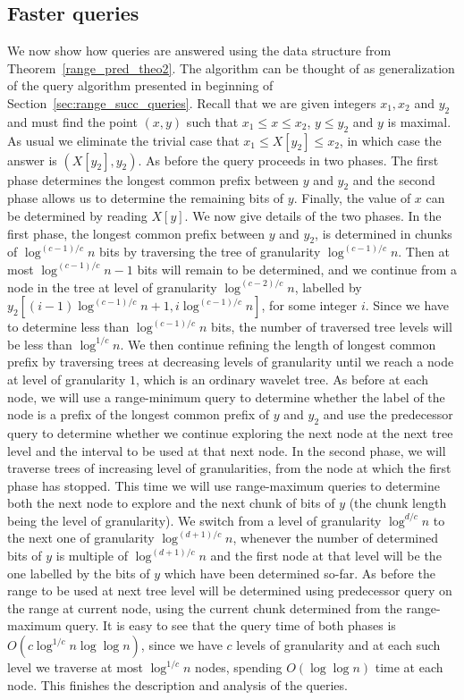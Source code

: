 \documentclass[11pt,runningheads]{llncs}
\begin{document}
\subsection{Faster queries}
\label{subsec:faster_range_pred}
We now show how queries are answered using the data structure
from Theorem~\ref{range_pred_theo2}. The algorithm can be thought of as generalization 
of the query algorithm presented in beginning of Section~\ref{sec:range_succ_queries}. 
Recall that we are given integers $x_1,x_2$ and $y_2$ and must find the point $(x,y)$
such that $x_1\leq x\leq x_2$, $y\leq y_2$ and $y$ is maximal. 
As usual we eliminate the trivial case that $x_1\leq X[y_2]\leq x_2$, 
in which case the answer is $(X[y_2],y_2)$. 
As before the query proceeds in two phases. The first phase
determines the longest common prefix between $y$ and $y_2$
and the second phase allows us to determine the remaining bits 
of $y$. Finally, the value of $x$ can be determined by reading $X[y]$. 
We now give details of the two phases. 
In the first phase, the longest common prefix between $y$ and $y_2$, is determined 
in chunks of $\log^{(c-1)/c}n$ bits by traversing the tree of granularity 
$\log^{(c-1)/c}n$. Then at most $\log^{(c-1)/c}n-1$ bits will remain to be determined, 
and we continue from a node in the tree at level of granularity $\log^{(c-2)/c}n$, 
labelled by $y_2[(i-1)\log^{(c-1)/c}n+1,i\log^{(c-1)/c}n]$, for some integer $i$.
Since we have to determine less than $\log^{(c-1)/c}n$ bits, the number of traversed 
tree levels will be less than $\log^{1/c}n$. We then continue refining the length of 
longest common prefix by traversing trees at decreasing levels of granularity until 
we reach a node at level of granularity $1$, which is an ordinary wavelet tree. 
As before at each node, we will use a range-minimum query to determine whether the label 
of the node is a prefix of the longest common prefix of $y$ and $y_2$ and use the  
predecessor query to determine whether we continue exploring the next node at the next tree level
and the interval to be used at that next node. 
In the second phase, we will traverse trees of increasing level of granularities, 
from the node at which the first phase has stopped. 
This time we will use range-maximum queries to determine both the next node 
to explore and the next chunk of bits of $y$ (the chunk length being the 
level of granularity). We switch from a level of granularity $\log^{d/c}n$ to the next 
one of granularity $\log^{(d+1)/c}n$, whenever the number of determined bits of $y$ 
is multiple of $\log^{(d+1)/c}n$ and the first node at that level will be the one 
labelled by the bits of $y$ which have been determined so-far. 
As before the range to be used at next tree level will be determined using predecessor 
query on the range at current node, using the current chunk determined from the 
range-maximum query. 
It is easy to see that the query time of both phases is $O(c\log^{1/c}n\log\log n)$, 
since we have $c$ levels of granularity and at each such level we traverse 
at most $\log^{1/c}n$ nodes, spending $O(\log\log n)$ time at each node. 
This finishes the description and analysis of the queries. 
\end{document}
